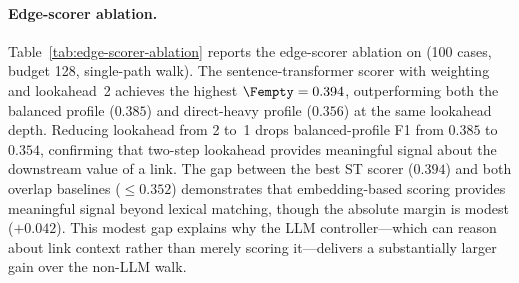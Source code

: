 \paragraph{Edge-scorer ablation.}
Table~\ref{tab:edge-scorer-ablation} reports the edge-scorer ablation
on \TwoWikiShort (100 cases, budget 128, single-path walk).
The sentence-transformer scorer with \stfuture weighting and
lookahead~2 achieves the highest $\Fempty = 0.394$, outperforming
both the balanced profile ($0.385$) and direct-heavy profile ($0.356$)
at the same lookahead depth.
Reducing lookahead from 2 to~1 drops balanced-profile F1 from $0.385$
to $0.354$, confirming that two-step lookahead provides meaningful
signal about the downstream value of a link.
The gap between the best ST scorer ($0.394$) and both overlap baselines
($\leq 0.352$) demonstrates that embedding-based scoring provides
meaningful signal beyond lexical matching, though the absolute margin
is modest ($+0.042$).
This modest gap explains why the LLM controller---which can reason
about link context rather than merely scoring it---delivers a
substantially larger gain over the non-LLM walk.
